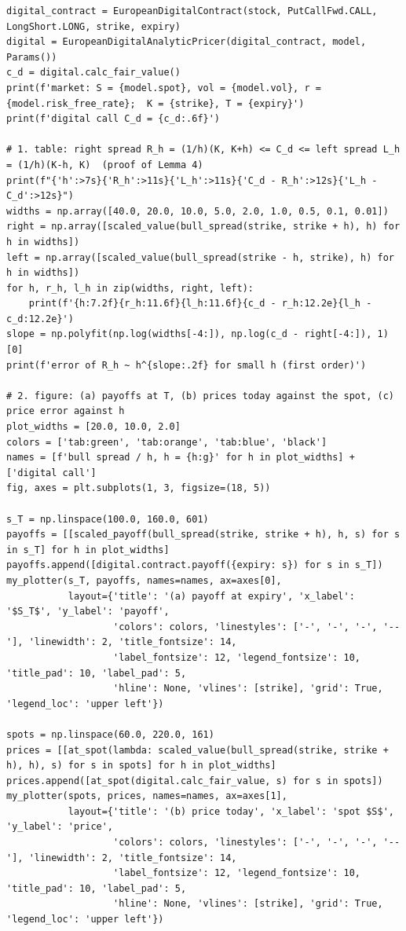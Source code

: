 \documentclass[11pt,a4paper]{article}
\begin{document}
\begin{lstlisting}[style=pysmall]
digital_contract = EuropeanDigitalContract(stock, PutCallFwd.CALL, LongShort.LONG, strike, expiry)
digital = EuropeanDigitalAnalyticPricer(digital_contract, model, Params())
c_d = digital.calc_fair_value()
print(f'market: S = {model.spot}, vol = {model.vol}, r = {model.risk_free_rate};  K = {strike}, T = {expiry}')
print(f'digital call C_d = {c_d:.6f}')

# 1. table: right spread R_h = (1/h)(K, K+h) <= C_d <= left spread L_h = (1/h)(K-h, K)  (proof of Lemma 4)
print(f"{'h':>7s}{'R_h':>11s}{'L_h':>11s}{'C_d - R_h':>12s}{'L_h - C_d':>12s}")
widths = np.array([40.0, 20.0, 10.0, 5.0, 2.0, 1.0, 0.5, 0.1, 0.01])
right = np.array([scaled_value(bull_spread(strike, strike + h), h) for h in widths])
left = np.array([scaled_value(bull_spread(strike - h, strike), h) for h in widths])
for h, r_h, l_h in zip(widths, right, left):
    print(f'{h:7.2f}{r_h:11.6f}{l_h:11.6f}{c_d - r_h:12.2e}{l_h - c_d:12.2e}')
slope = np.polyfit(np.log(widths[-4:]), np.log(c_d - right[-4:]), 1)[0]
print(f'error of R_h ~ h^{slope:.2f} for small h (first order)')

# 2. figure: (a) payoffs at T, (b) prices today against the spot, (c) price error against h
plot_widths = [20.0, 10.0, 2.0]
colors = ['tab:green', 'tab:orange', 'tab:blue', 'black']
names = [f'bull spread / h, h = {h:g}' for h in plot_widths] + ['digital call']
fig, axes = plt.subplots(1, 3, figsize=(18, 5))

s_T = np.linspace(100.0, 160.0, 601)
payoffs = [[scaled_payoff(bull_spread(strike, strike + h), h, s) for s in s_T] for h in plot_widths]
payoffs.append([digital.contract.payoff({expiry: s}) for s in s_T])
my_plotter(s_T, payoffs, names=names, ax=axes[0],
           layout={'title': '(a) payoff at expiry', 'x_label': '$S_T$', 'y_label': 'payoff',
                   'colors': colors, 'linestyles': ['-', '-', '-', '--'], 'linewidth': 2, 'title_fontsize': 14,
                   'label_fontsize': 12, 'legend_fontsize': 10, 'title_pad': 10, 'label_pad': 5,
                   'hline': None, 'vlines': [strike], 'grid': True, 'legend_loc': 'upper left'})

spots = np.linspace(60.0, 220.0, 161)
prices = [[at_spot(lambda: scaled_value(bull_spread(strike, strike + h), h), s) for s in spots] for h in plot_widths]
prices.append([at_spot(digital.calc_fair_value, s) for s in spots])
my_plotter(spots, prices, names=names, ax=axes[1],
           layout={'title': '(b) price today', 'x_label': 'spot $S$', 'y_label': 'price',
                   'colors': colors, 'linestyles': ['-', '-', '-', '--'], 'linewidth': 2, 'title_fontsize': 14,
                   'label_fontsize': 12, 'legend_fontsize': 10, 'title_pad': 10, 'label_pad': 5,
                   'hline': None, 'vlines': [strike], 'grid': True, 'legend_loc': 'upper left'})


\end{lstlisting}
\end{document}
